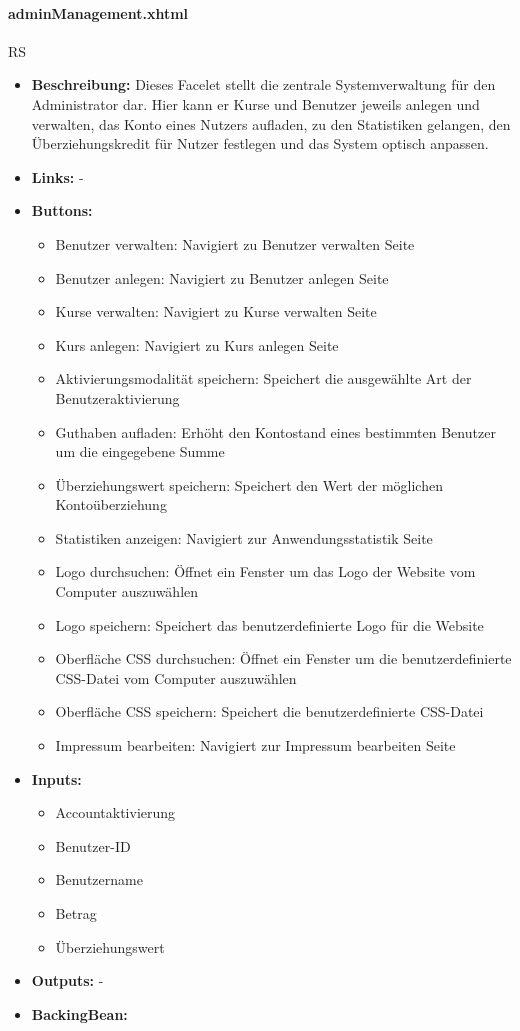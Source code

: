 				\paragraph{adminManagement.xhtml}
					RS\\
					\begin{itemize}
						\item \textbf{Beschreibung:} Dieses Facelet stellt die zentrale Systemverwaltung für den Administrator dar. Hier kann er Kurse und Benutzer jeweils anlegen und verwalten, das Konto eines Nutzers aufladen, zu den Statistiken gelangen, den Überziehungskredit für Nutzer festlegen und das System optisch anpassen.
						\item \textbf{Links:} -
						\item \textbf{Buttons:}
							\begin{itemize}
								\item Benutzer verwalten: Navigiert zu Benutzer verwalten Seite
								\item Benutzer anlegen: Navigiert zu Benutzer anlegen Seite
								\item Kurse verwalten: Navigiert zu Kurse verwalten Seite
								\item Kurs anlegen: Navigiert zu Kurs anlegen Seite
								\item Aktivierungsmodalität speichern: Speichert die ausgewählte Art der Benutzeraktivierung
								\item Guthaben aufladen: Erhöht den Kontostand eines bestimmten Benutzer um die eingegebene Summe 
								\item Überziehungswert speichern: Speichert den Wert der möglichen Kontoüberziehung
								\item Statistiken anzeigen: Navigiert zur Anwendungsstatistik Seite
								\item Logo durchsuchen: Öffnet ein Fenster um das Logo der Website vom Computer auszuwählen
								\item Logo speichern: Speichert das benutzerdefinierte Logo für die Website
								\item Oberfläche CSS durchsuchen: Öffnet ein Fenster um die benutzerdefinierte CSS-Datei vom Computer auszuwählen
								\item Oberfläche CSS speichern: Speichert die benutzerdefinierte CSS-Datei
								\item Impressum bearbeiten: Navigiert zur Impressum bearbeiten Seite
							\end{itemize}
						\item \textbf{Inputs:}
							\begin{itemize}
								\item Accountaktivierung
								\item Benutzer-ID
								\item Benutzername
								\item Betrag
								\item Überziehungswert
							\end{itemize}
						\item \textbf{Outputs:} -
						\item \textbf{BackingBean:}
					\end{itemize}
				

